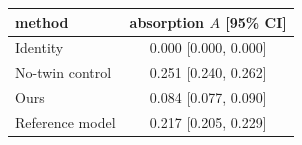 \begin{tabular}{lc}
\toprule
method & absorption $A$ [95\% CI] \\
\midrule
Identity & 0.000 [0.000, 0.000] \\
No-twin control & 0.251 [0.240, 0.262] \\
Ours & 0.084 [0.077, 0.090] \\
Reference model & 0.217 [0.205, 0.229] \\
\bottomrule
\end{tabular}
